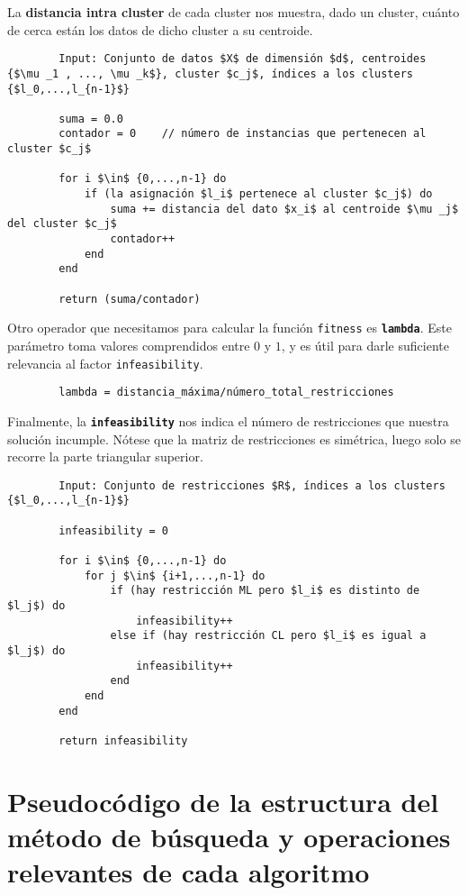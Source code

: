 		La \textbf{distancia intra cluster} de cada cluster nos muestra, dado un cluster, cuánto de cerca están los datos de dicho cluster a su centroide.

		\footnotesize
		\begin{lstlisting}
		Input: Conjunto de datos $X$ de dimensión $d$, centroides {$\mu _1 , ..., \mu _k$}, cluster $c_j$, índices a los clusters {$l_0,...,l_{n-1}$}

		suma = 0.0
		contador = 0	// número de instancias que pertenecen al cluster $c_j$

		for i $\in$ {0,...,n-1} do
			if (la asignación $l_i$ pertenece al cluster $c_j$) do
				suma += distancia del dato $x_i$ al centroide $\mu _j$ del cluster $c_j$
				contador++
			end
		end

		return (suma/contador)
		\end{lstlisting}
		\normalsize

		Otro operador que necesitamos para calcular la función \lstinline!fitness! es \textbf{\lstinline!lambda!}.
		Este parámetro toma valores comprendidos entre $0$ y $1$, y es útil para darle suficiente relevancia al factor \lstinline!infeasibility!. 

		\footnotesize
		\begin{lstlisting}
		lambda = distancia_máxima/número_total_restricciones
		\end{lstlisting}
		\normalsize

		Finalmente, la \textbf{\lstinline!infeasibility!} nos indica el número de restricciones que nuestra solución incumple.
		Nótese que la matriz de restricciones es simétrica, luego solo se recorre la parte triangular superior.

		\newpage

		\footnotesize
		\begin{lstlisting}
		Input: Conjunto de restricciones $R$, índices a los clusters {$l_0,...,l_{n-1}$}

		infeasibility = 0

		for i $\in$ {0,...,n-1} do
			for j $\in$ {i+1,...,n-1} do
				if (hay restricción ML pero $l_i$ es distinto de $l_j$) do
					infeasibility++
				else if (hay restricción CL pero $l_i$ es igual a $l_j$) do
					infeasibility++
				end
			end
		end

		return infeasibility
		\end{lstlisting}
		\normalsize

\newpage

\section{Pseudocódigo de la estructura del método de búsqueda y operaciones relevantes de cada algoritmo}
